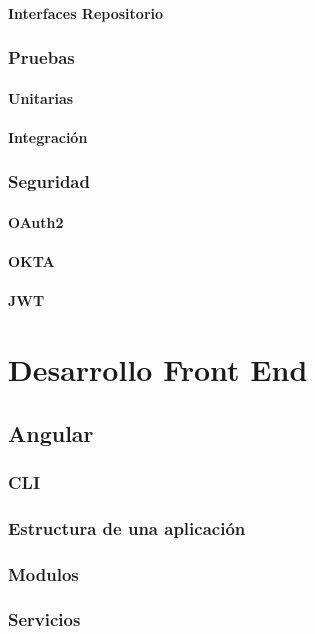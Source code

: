 \documentclass[12pt,article,oneside]{memoir}
\begin{document}
			\subsection{Interfaces Repositorio}
	\newpage
		\section{Pruebas}
			\subsection{Unitarias}
			\subsection{Integraci\'on}
	\newpage
		\section{Seguridad}
			\subsection{OAuth2}
			\subsection{OKTA}
			\subsection{JWT}
	\newpage
			
\part{  Desarrollo Front End}
	\chapter{Angular}
	\newpage
		\section{CLI}
	\newpage
	 	\section{Estructura de una aplicaci\'on}
	\newpage
		\section{Modulos}
	\newpage
		\section{Servicios}
	\newpage
\end{document}
